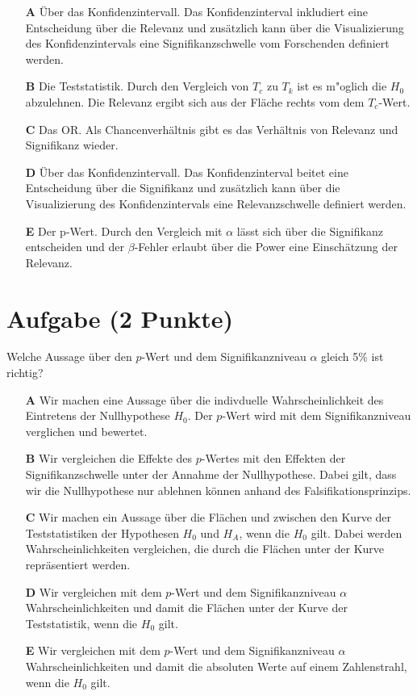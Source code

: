 \documentclass[a4paper, 9pt]{scrartcl}\usepackage[]{graphicx}\usepackage[]{xcolor}
\begin{document}
\begin{enumerate}
\item [\textbf{A} \msquare] Über das Konfidenzintervall. Das Konfidenzinterval inkludiert eine Entscheidung über die Relevanz und zusätzlich kann über die Visualizierung des Konfidenzintervals eine Signifikanzschwelle vom Forschenden definiert werden.
\item [\textbf{B} \msquare] Die Teststatistik. Durch den Vergleich von $T_c$ zu $T_k$ ist es m{"o}glich die $H_0$ abzulehnen. Die Relevanz ergibt sich aus der Fläche rechts vom dem $T_c$-Wert.
\item [\textbf{C} \msquare] Das OR. Als Chancenverhältnis gibt es das Verhältnis von Relevanz und Signifikanz wieder.
\item [\textbf{D} \msquare] Über das Konfidenzintervall. Das Konfidenzinterval beitet eine Entscheidung über die Signifikanz und zusätzlich kann über die Visualizierung des Konfidenzintervals eine Relevanzschwelle definiert werden.
\item [\textbf{E} \msquare] Der p-Wert. Durch den Vergleich mit $\alpha$ lässt sich über die Signifikanz entscheiden und der $\beta$-Fehler erlaubt über die Power eine Einschätzung der Relevanz.
\end{enumerate}

\section{Aufgabe \hfill (2 Punkte)}



Welche Aussage über den $p$-Wert und dem Signifikanzniveau $\alpha$ gleich 5\% ist richtig?



\begin{enumerate}
\item [\textbf{A} \msquare] Wir machen eine Aussage über die indivduelle Wahrscheinlichkeit des Eintretens der Nullhypothese $H_0$. Der $p$-Wert wird mit dem Signifikanzniveau verglichen und bewertet.
\item [\textbf{B} \msquare] Wir vergleichen die Effekte des $p$-Wertes mit den Effekten der Signifikanzschwelle unter der Annahme der Nullhypothese. Dabei gilt, dass wir die Nullhypothese nur ablehnen können anhand des Falsifikationsprinzips.
\item [\textbf{C} \msquare] Wir machen ein Aussage über die Flächen und zwischen den Kurve der Teststatistiken der Hypothesen $H_0$ und $H_A$, wenn die $H_0$ gilt. Dabei werden Wahrscheinlichkeiten vergleichen, die durch die Flächen unter der Kurve repräsentiert werden.
\item [\textbf{D} \msquare] Wir vergleichen mit dem $p$-Wert und dem Signifikanzniveau $\alpha$ Wahrscheinlichkeiten und damit die Flächen unter der Kurve der Teststatistik, wenn die $H_0$ gilt.
\item [\textbf{E} \msquare] Wir vergleichen mit dem $p$-Wert und dem Signifikanzniveau $\alpha$ Wahrscheinlichkeiten und damit die absoluten Werte auf einem Zahlenstrahl, wenn die $H_0$ gilt.
\end{enumerate}
\end{document}
